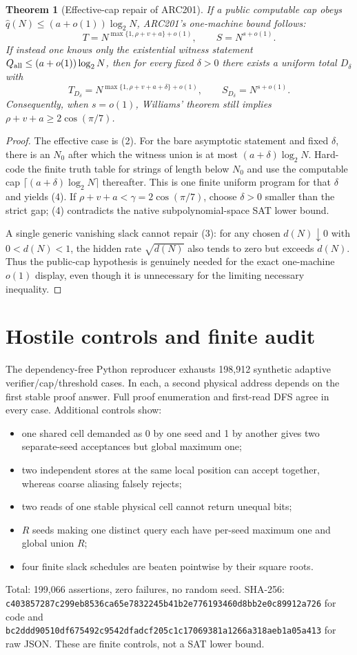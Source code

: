 \documentclass[11pt]{article}
\newtheorem{theorem}{Theorem}
\begin{document}
\begin{theorem}[Effective-cap repair of ARC201]
If a public computable cap obeys
$\widehat q(N)\le(a+o(1))\log_2N$, ARC201's one-machine bound follows:
\[
T=N^{\max\{1,\rho+v+a\}+o(1)},\qquad S=N^{s+o(1)}.                \tag{3}
\]
If instead one knows only the existential witness statement
$Q_{\rm all}\le(a+o(1))\log_2N$, then for every fixed $\delta>0$ there exists
a uniform total $D_\delta$ with
\[
T_{D_\delta}=N^{\max\{1,\rho+v+a+\delta\}+o(1)},
\qquad S_{D_\delta}=N^{s+o(1)}.                                  \tag{4}
\]
Consequently, when $s=o(1)$, Williams' theorem still implies
$\rho+v+a\ge2\cos(\pi/7)$.
\end{theorem}
\begin{proof}
The effective case is (2).  For the bare asymptotic statement and fixed
$\delta$, there is an $N_0$ after which the witness union is at most
$(a+\delta)\log_2N$.  Hard-code the finite truth table for strings of length
below $N_0$ and use the computable cap
$\lceil(a+\delta)\log_2N\rceil$ thereafter.  This is one finite uniform
program for that $\delta$ and yields (4).  If
$\rho+v+a<\gamma=2\cos(\pi/7)$, choose $\delta>0$ smaller than the strict
gap; (4) contradicts the native subpolynomial-space SAT lower bound.

A single generic vanishing slack cannot repair (3): for any chosen
$d(N)\downarrow0$ with $0<d(N)<1$, the hidden rate $\sqrt{d(N)}$ also tends to
zero but exceeds $d(N)$.  Thus the public-cap hypothesis is genuinely needed
for the exact one-machine $o(1)$ display, even though it is unnecessary for
the limiting necessary inequality.
\end{proof}

\section{Hostile controls and finite audit}
The dependency-free Python reproducer exhausts 198,912 synthetic adaptive
verifier/cap/threshold cases.  In each, a second physical address depends on
the first stable proof answer.  Full proof enumeration and first-read DFS
agree in every case.  Additional controls show:
\begin{itemize}
\item one shared cell demanded as 0 by one seed and 1 by another gives two
separate-seed acceptances but global maximum one;
\item two independent stores at the same local position can accept together,
whereas coarse aliasing falsely rejects;
\item two reads of one stable physical cell cannot return unequal bits;
\item $R$ seeds making one distinct query each have per-seed maximum one and
global union $R$;
\item four finite slack schedules are beaten pointwise by their square roots.
\end{itemize}
Total: 199,066 assertions, zero failures, no random seed.  SHA-256:
\texttt{c403857287c299eb8536ca65e7832245b41b2e776193460d8bb2e0c89912a726}
for code and
\texttt{bc2ddd90510df675492c9542dfadcf205c1c17069381a1266a318aeb1a05a413}
for raw JSON.  These are finite controls, not a SAT lower bound.
\end{document}
